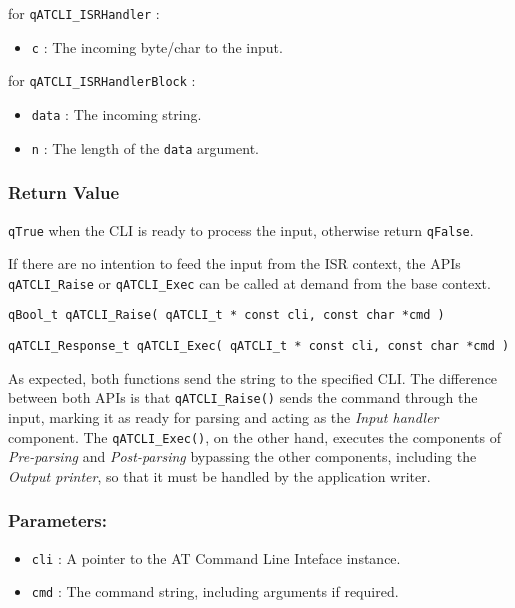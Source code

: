 for \lstinline{qATCLI_ISRHandler} :
\begin{itemize}
    \item \lstinline{c} : The incoming byte/char to the input. 
\end{itemize}

for \lstinline{qATCLI_ISRHandlerBlock} :
\begin{itemize}
    \item \lstinline{data} : The incoming string.
    \item \lstinline{n} : The length of the \lstinline{data} argument.
\end{itemize}

\subsubsection*{Return Value}
\lstinline{qTrue} when the CLI is ready to process the input, otherwise return \lstinline{qFalse}.

\noindent\hrulefill
\newline
If there are no intention to feed the input from the ISR context, the APIs \lstinline{qATCLI_Raise}  or \lstinline{qATCLI_Exec}  can be called at demand from the base context. \\

\begin{lstlisting}[style=CStyle]
qBool_t qATCLI_Raise( qATCLI_t * const cli, const char *cmd )
\end{lstlisting}

\begin{lstlisting}[style=CStyle]
qATCLI_Response_t qATCLI_Exec( qATCLI_t * const cli, const char *cmd )
\end{lstlisting}

As expected, both functions send the string to the specified CLI.
The difference between both APIs is that \lstinline{qATCLI_Raise()} sends the command through the input, marking it as ready for parsing and acting as the \textit{Input handler} component.
The \lstinline{qATCLI_Exec()}, on the other hand, executes the components of \textit{Pre-parsing} and \textit{Post-parsing} bypassing the other components, including the \textit{Output printer}, so that it must be handled by the application writer.

\subsubsection*{Parameters:}
\begin{itemize}
    \item \lstinline{cli} : A pointer to the AT Command Line Inteface instance.
    \item \lstinline{cmd} : The command string, including arguments if required.
\end{itemize}

